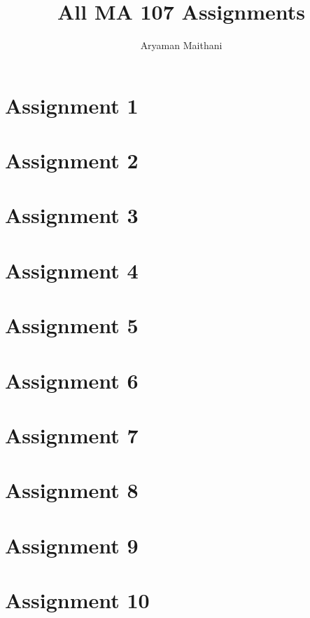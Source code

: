 \documentclass[12 pt, a4paper, toc=graduated, oneside]{book}
\title{All MA 107 Assignments}
\author{Aryaman Maithani}
\date{}
\begin{document}
\maketitle
\newpage
\chapter*{Assignment 1}\label{assign:1}

%
\chapter*{Assignment 2}\label{assign:2}

%
\chapter*{Assignment 3}\label{assign:3}

%
\chapter*{Assignment 4}\label{assign:4}

%
\chapter*{Assignment 5}\label{assign:5}

%
\chapter*{Assignment 6}\label{assign:6}

%
\chapter*{Assignment 7}\label{assign:7}

%
\chapter*{Assignment 8}\label{assign:8}

%
\chapter*{Assignment 9}\label{assign:9}

%
\chapter*{Assignment 10}\label{assign:10}

%
\end{document}

